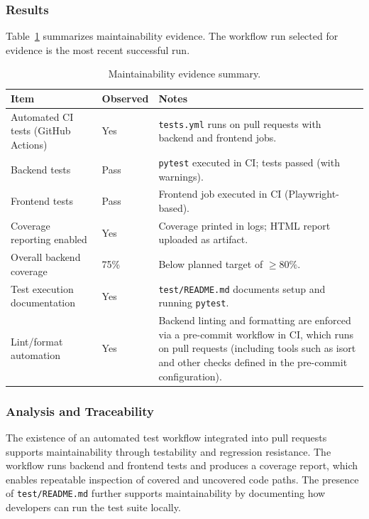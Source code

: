 \documentclass[12pt, titlepage]{article}
\begin{document}
\subsubsection{Results}
Table~\ref{tab:maint-results} summarizes maintainability evidence.
The workflow run selected for evidence is the most recent successful run.

\begin{table}[H]
  \centering
  \caption{Maintainability evidence summary.}
  \label{tab:maint-results}
  \begin{tabular}{@{}p{}p{}p{}@{}}
    \toprule
    \textbf{Item} & \textbf{Observed} & \textbf{Notes} \\
    \midrule
    Automated CI tests (GitHub Actions) &
      Yes &
      \texttt{tests.yml} runs on pull requests with backend and frontend jobs. \\
    Backend tests &
      Pass &
      \texttt{pytest} executed in CI; tests passed (with warnings). \\
    Frontend tests &
      Pass &
      Frontend job executed in CI (Playwright-based). \\
    Coverage reporting enabled &
      Yes &
      Coverage printed in logs; HTML report uploaded as artifact. \\
    Overall backend coverage &
      75\% &
      Below planned target of $\geq 80\%$. \\
    Test execution documentation &
      Yes &
      \texttt{test/README.md} documents setup and running \texttt{pytest}. \\
    Lint/format automation &
      Yes &
      Backend linting and formatting are enforced via a pre-commit workflow in CI,
      which runs on pull requests (including tools such as isort and other checks
      defined in the pre-commit configuration). \\
    \bottomrule
  \end{tabular}
\end{table}

\subsubsection{Analysis and Traceability}
The existence of an automated test workflow integrated into pull requests
supports maintainability through testability and regression resistance.  The
workflow runs backend and frontend tests and produces a coverage report, which
enables repeatable inspection of covered and uncovered code paths.  The
presence of \texttt{test/README.md} further supports maintainability by
documenting how developers can run the test suite locally.
\end{document}
